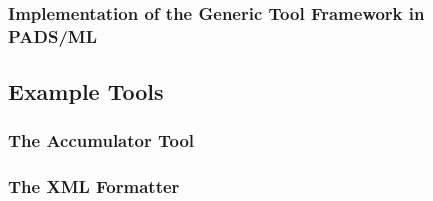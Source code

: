 \subsubsection{Implementation of the Generic Tool Framework in PADS/ML}
\label{sec:gen-tool-interface-implementation}

\subsection{Example Tools}
\label{sec:gen-tool-examples}

\subsubsection{The Accumulator Tool}
\label{sec:gen-tool-examples-acc}

\subsubsection{The XML Formatter}
\label{sec:gen-tool-examples-xml}

